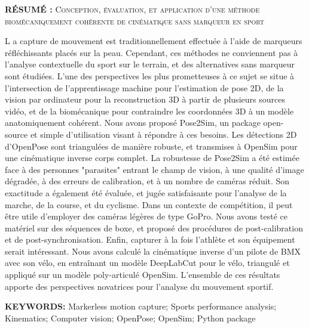 \vspace*{1cm}

\noindent\textbf{RÉSUMÉ : } \textsc{Conception, évaluation, et application d’une méthode biomécaniquement cohérente de cinématique sans marqueur en sport}

\lettrine[lines=1]{L}{ }a capture de mouvement est traditionnellement effectuée à l'aide de marqueurs réfléchissants placés sur la peau. Cependant, ces méthodes ne conviennent pas à l'analyse contextuelle du sport sur le terrain, et des alternatives sans marqueur sont étudiées. L'une des perspectives les plus prometteuses à ce sujet se situe à l'intersection de l'apprentissage machine pour l'estimation de pose 2D, de la vision par ordinateur pour la reconstruction 3D à partir de plusieurs sources vidéo, et de la biomécanique pour contraindre les coordonnées 3D à un modèle anatomiquement cohérent. Nous avons proposé Pose2Sim, un package open-source et simple d'utilisation visant à répondre à ces besoins. Les détections 2D d'OpenPose sont triangulées de manière robuste, et transmises à OpenSim pour une cinématique inverse corps complet. La robustesse de Pose2Sim a été estimée face à des personnes "parasites" entrant le champ de vision, à une qualité d'image dégradée, à des erreurs de calibration, et à un nombre de caméras réduit. Son exactitude a également été évaluée, et jugée satisfaisante pour l'analyse de la marche, de la course, et du cyclisme. Dans un contexte de compétition, il peut être utile d'employer des caméras légères de type GoPro. Nous avons testé ce matériel sur des séquences de boxe, et proposé des procédures de post-calibration et de post-synchronisation. Enfin, capturer à la fois l'athlète et son équipement serait intéressant. Nous avons calculé la cinématique inverse d'un pilote de BMX avec son vélo, en entraînant un modèle DeepLabCut pour le vélo, triangulé et appliqué sur un modèle poly-articulé OpenSim. L'ensemble de ces résultats apporte des perspectives novatrices pour l'analyse du mouvement sportif.

\vspace*{1cm}
\noindent\textbf{KEYWORDS:} Markerless motion capture; Sports performance analysis; Kinematics; Computer vision; OpenPose; OpenSim; Python package






